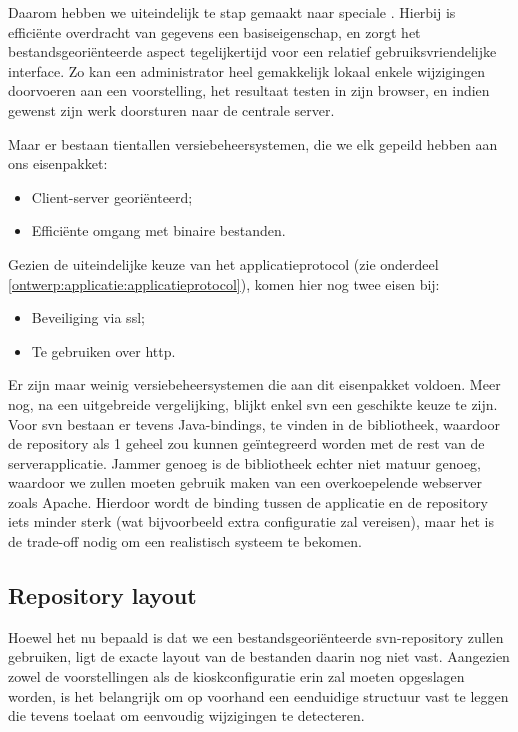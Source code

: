 \documentclass[verslag.tex]{subfiles}
\begin{document}
Daarom hebben we uiteindelijk te stap gemaakt naar speciale . Hierbij is efficiënte overdracht van gegevens een basiseigenschap, en zorgt het bestandsgeoriënteerde aspect tegelijkertijd voor een relatief gebruiksvriendelijke interface. Zo kan een administrator heel gemakkelijk lokaal enkele wijzigingen doorvoeren aan een voorstelling, het resultaat testen in zijn browser, en indien gewenst zijn werk doorsturen naar de centrale server.

Maar er bestaan tientallen versiebeheersystemen, die we elk gepeild hebben aan ons eisenpakket:
\begin{itemize}
\item Client-server georiënteerd;
\item Efficiënte omgang met binaire bestanden.
\end{itemize}

Gezien de uiteindelijke keuze van het applicatieprotocol (zie onderdeel \ref{ontwerp:applicatie:applicatieprotocol}), komen hier nog twee eisen bij:
\begin{itemize}
\item Beveiliging via \ac{ssl};
\item Te gebruiken over \ac{http}.
\end{itemize}

Er zijn maar weinig versiebeheersystemen die aan dit eisenpakket voldoen. Meer nog, na een uitgebreide vergelijking, blijkt enkel \ac{svn} een geschikte keuze te zijn. Voor \ac{svn} bestaan er tevens Java-bindings, te vinden in de  bibliotheek, waardoor de repository als 1 geheel zou kunnen geïntegreerd worden met de rest van de serverapplicatie. Jammer genoeg is de bibliotheek echter niet matuur genoeg, waardoor we zullen moeten gebruik maken van een overkoepelende webserver zoals Apache. Hierdoor wordt de binding tussen de applicatie en de repository iets minder sterk (wat bijvoorbeeld extra configuratie zal vereisen), maar het is de trade-off nodig om een realistisch systeem te bekomen.

\subsection{Repository layout}

Hoewel het nu bepaald is dat we een bestandsgeoriënteerde \ac{svn}-repository zullen gebruiken, ligt de exacte layout van de bestanden daarin nog niet vast. Aangezien zowel de voorstellingen als de kioskconfiguratie erin zal moeten opgeslagen worden, is het belangrijk om op voorhand een eenduidige structuur vast te leggen die tevens toelaat om eenvoudig wijzigingen te detecteren.
\end{document}
